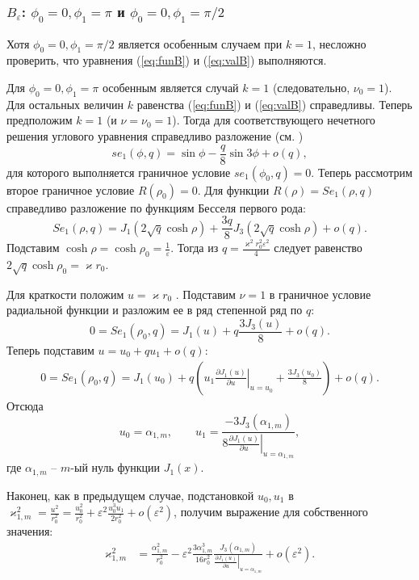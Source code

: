 \subsubsection{$B_\varepsilon$: $\phi_0=0, \phi_1=\pi$ и $\phi_0=0, \phi_1=\pi/2$}\label{sec:ch2/sec2/sub3/sub2}


Хотя $\phi_0=0, \phi_1=\pi/2$ является особенным случаем при $k=1$,
несложно проверить, что уравнения (\ref{eq:funB}) и (\ref{eq:valB}) выполняются.

Для  $\phi_0=0, \phi_1=\pi$
особенным является случай  $k=1$ (следовательно, $\nu_0=1$). 
Для остальных величин $k$ равенства (\ref{eq:funB}) и (\ref{eq:valB}) справедливы.
Теперь предположим $k=1$ (и $\nu=\nu_0 = 1$).
Тогда для соответствующего нечетного решения углового уравнения справедливо разложение  (см. \cite[Subsect.~20.2.27]{wref2})
\begin{equation*}
se_1(\phi, q) = 	\sin{\phi}  - 	\frac{q}{8} \sin{3\phi} + o(q),
 \end{equation*}
для которого выполняется граничное условие $se_1(\phi_0, q)=0$. 
Теперь рассмотрим второе граничное условие $R(\rho_0) = 0$. 
Для функции $R(\rho) = Se_1(\rho, q)$ справедливо разложение по функциям Бесселя первого рода:
\begin{equation*}
Se_1(\rho, q) = J_1(2\sqrt{q} \cosh{\rho}) + \frac{3 q}{8} J_3(2\sqrt{q}\cosh{\rho}) + o(q).
\end{equation*}
Подставим $\cosh \rho = \cosh \rho_0 =\frac{1}{\varepsilon}$.
Тогда из $q = \frac{\varkappa^2 r_0^2 \varepsilon^2}{4}$ следует равенство
$2\sqrt{q} \cosh{\rho_0} =  \varkappa r_0$.

Для краткости положим $u = \varkappa r_0$ .
Подставим $\nu = 1$ в граничное условие радиальной функции и разложим ее в ряд степенной ряд по $q$:
\begin{equation*}
    0 = Se_1(\rho_0, q) = 
    J_1(u) + q  \frac{3 J_3(u)}{8} + o(q).
\end{equation*}
Теперь подставим $u = u_0 + q u_1 + o(q)$:
\begin{align*}
    0 = Se_1(\rho_0, q) =    J_1(u_0) + q \left( 
    u_1 \left.\frac{\partial J_1 (u)}{\partial u}\right|_{u=u_0}
    + \frac{3 J_3(u_0)}{8}
    \right) + o(q).
\end{align*}
Отсюда 
\begin{equation*}
u_0 = \alpha_{1, m}, \qquad u_1 = 
\frac{ - 3 J_3(\alpha_{1, m}) }{8\left.
\frac{\partial J_1 (u)}{\partial u}\right|_{u=\alpha_{1, m}}},
\end{equation*}
где $\alpha_{1, m}$ -- $m$-ый нуль функции $J_1(x)$. 

Наконец, как в предыдущем случае, подстановкой $u_0, u_1$ в $\varkappa_{1, m}^2 = \frac{u^2}{r_0^2} = \frac{u_0^2}{r_0^2} + \varepsilon^2 \frac{u_0^3 u_1}{2r_0^2} + o(\varepsilon^2)$, получим выражение для собственного значения:
\begin{align}
    \varkappa_{1, m}^2& = \frac{\alpha_{1, m}^2}{r_0^2} - \varepsilon^2 \frac{3\alpha_{1, m}^3}{16r_0^2} 
    \frac{J_3(\alpha_{1, m})}{\left.\frac{\partial J_1 (u)}{\partial u}\right|_{u=\alpha_{1, m}}} 
    + o(\varepsilon^2).  \label{eq:valS2}
\end{align}



\FloatBarrier
